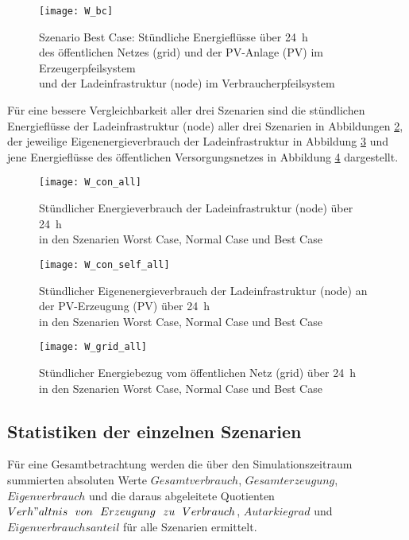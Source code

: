 		\begin{figure}[h]
			\centering
			\texttt{[image: W\_bc]}
			\caption{Szenario Best Case: Stündliche Energieflüsse über 24~h \\ 
            	des öffentlichen Netzes (grid) und der PV-Anlage (PV) im Erzeugerpfeilsystem \\
            	und der Ladeinfrastruktur (node) im Verbraucherpfeilsystem}
			\label{Abb:Sim_W_bc}
		\end{figure}

		Für eine bessere Vergleichbarkeit aller drei Szenarien sind die stündlichen Energieflüsse der Ladeinfrastruktur (node) aller drei Szenarien in Abbildungen \ref{Abb:Sim_W_con_all}, der jeweilige Eigenenergieverbrauch der Ladeinfrastruktur in Abbildung \ref{Abb:Sim_W_con_self_all} und jene Energieflüsse des öffentlichen Versorgungsnetzes in Abbildung \ref{Abb:Sim_W_grid_all} dargestellt.\\
        
		\begin{figure}[h]
			\centering
			\texttt{[image: W\_con\_all]}
			\caption{Stündlicher Energieverbrauch der Ladeinfrastruktur (node) über 24~h \\
            	in den Szenarien Worst Case, Normal Case und Best Case}
			\label{Abb:Sim_W_con_all}
		\end{figure}

		\begin{figure}[h]
			\centering
			\texttt{[image: W\_con\_self\_all]}
			\caption{Stündlicher Eigenenergieverbrauch der Ladeinfrastruktur (node) an der PV-Erzeugung (PV) über 24~h \\
            	in den Szenarien Worst Case, Normal Case und Best Case}
			\label{Abb:Sim_W_con_self_all}
		\end{figure}

		\begin{figure}[h]
			\centering
			\texttt{[image: W\_grid\_all]}
			\caption{Stündlicher Energiebezug vom öffentlichen Netz (grid) über 24~h\\
            	in den Szenarien Worst Case, Normal Case und Best Case}
			\label{Abb:Sim_W_grid_all}
		\end{figure}

	\subsection{Statistiken der einzelnen Szenarien}
		Für eine Gesamtbetrachtung werden die über den Simulationszeitraum summierten absoluten Werte $Gesamtverbrauch$, $Gesamterzeugung$, $Eigenverbrauch$ und die daraus abgeleitete Quotienten $Verh"altnis~~von~~Erzeugung~~zu~~Verbrauch$, $Autarkiegrad$ und $Eigenverbrauchsanteil$ für alle Szenarien ermittelt. \\
        
